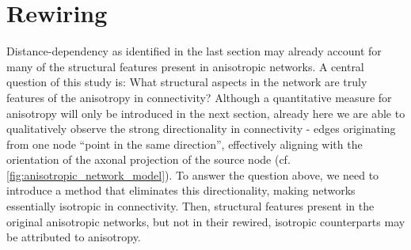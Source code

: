 




\section{Rewiring}\label{sec:rewiring}





Distance-dependency as identified in the last section may already
account for many of the structural features present in anisotropic
networks. A central question of this study is: What structural aspects
in the network are truly features of the anisotropy in connectivity?
Although a quantitative measure for anisotropy will only be introduced
in the next section, already here we are able to qualitatively observe
the strong directionality in connectivity - edges originating from one
node \enquote{point in the same direction}, effectively aligning with
the orientation of the axonal projection of the source node
(cf. \autoref{fig:anisotropic_network_model}). 
To answer the question above, we need to introduce a method that
eliminates this directionality, making networks essentially isotropic
in connectivity. Then, structural features present in the original
anisotropic networks, but not in their rewired, isotropic counterparts
may be attributed to anisotropy.

